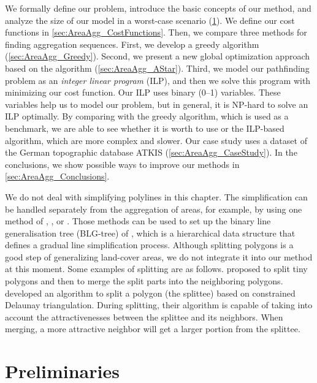 We formally define our problem, 
introduce the basic concepts of our method, 
and analyze the size of our model in a worst-case scenario
(\sect\ref{sec:AreaAgg_Preliminaries}).
We define our cost functions in 
\sect\ref{sec:AreaAgg_CostFunctions}.
Then, we compare three methods for finding aggregation sequences.
First, we develop 
a greedy algorithm (\sect\ref{sec:AreaAgg_Greedy}).
Second, we present a new global optimization approach
based on the \Astar algorithm 
(\sect\ref{sec:AreaAgg_AStar}).
Third, we model our pathfinding problem as
an \emph{integer linear program} (ILP), 
and then we solve this program with minimizing our cost function.
Our ILP uses binary (0--1) variables. 
These variables help us to model our problem, 
but in general, it is NP-hard 
to solve an ILP optimally.
By comparing with the greedy algorithm, 
which is used as a benchmark,
we are able to see whether it is worth 
to use \Astar or the ILP-based algorithm, 
which are more complex and slower.  
Our case study 
uses a dataset of the German topographic database ATKIS 
(\sect\ref{sec:AreaAgg_CaseStudy}).
In the conclusions, we show possible ways to improve our 
methods in \sect\ref{sec:AreaAgg_Conclusions}. 

We do not deal with simplifying polylines in this chapter.
The simplification can be handled separately from the
aggregation of areas, for example, 
by using one method of 
\textcite{Douglas1973},
\textcite{Saalfeld1999},
or \textcite{Wu2004DP}.
Those methods can be used to set up 
the binary line generalisation tree (BLG-tree) of
\textcite{vanOosterom1995Development},
which is a hierarchical data structure that 
defines a gradual line simplification process.
%
Although splitting polygons is a good step
of generalizing land-cover areas,
we do not integrate it into our method at this moment.
Some examples of splitting are as follows.
\textcite{Smith2007MasterMap,Thiemann2018LandCover} 
proposed to split tiny polygons 
and then to merge the split parts into the neighboring polygons.
\textcite{Meijers2016Split} developed an algorithm 
to split a polygon (the splittee) 
based on constrained Delaunay triangulation.
During splitting, their algorithm is capable of
taking into account
the attractivenesses between the splittee and its neighbors.
When merging, a more attractive neighbor 
will get a larger portion from the splittee.


\section{Preliminaries}
\label{sec:AreaAgg_Preliminaries}


